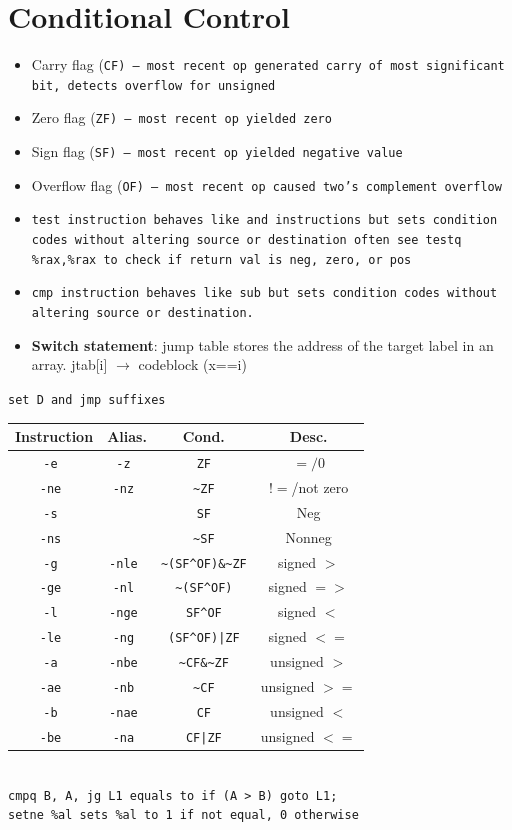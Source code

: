 \section{Conditional Control}
\begin{itemize}[noitemsep, topsep=1pt]
    \item Carry flag (\tt{CF}) -- most recent op generated carry of most significant bit, detects overflow for unsigned
    \item Zero flag (\tt{ZF}) -- most recent op yielded zero
    \item Sign flag (\tt{SF}) -- most recent op yielded negative value
    \item Overflow flag (\tt{OF}) -- most recent op caused two's complement overflow
    \item \tt{test} instruction behaves like \tt{and} instructions but sets condition codes without altering source or destination often see \tt{testq \%rax,\%rax} to check if return val is neg, zero, or pos
    \item \tt{cmp} instruction behaves like \tt{sub} but sets condition codes without altering source or destination.
    \item \textbf{Switch statement}: jump table stores the address of the target label in an array. jtab[i] $\to$ codeblock (x==i)

\end{itemize}
\begin{center}
    \tt{set D} and \tt{jmp} suffixes 
    \begin{tabular}{| c || c | c | c |}
        \hline
        \textbf{Instruction} & \textbf{Alias.} & \textbf{Cond.} & \textbf{Desc.} \\ \hline
        \tt{-e} & \tt{-z} & \verb|ZF| & $=/0$ \\ \hline
        \tt{-ne} & \tt{-nz} & \verb|~ZF| & $!=$/not zero \\ \hline
        \tt{-s} &  & \verb|SF| & Neg \\ \hline
        \tt{-ns} &  & \verb|~SF| & Nonneg \\ \hline
        \tt{-g} & \tt{-nle} & \verb|~(SF^OF)&~ZF| & signed $>$ \\ \hline
        \tt{-ge} & \tt{-nl} & \verb|~(SF^OF)| & signed $=>$ \\ \hline
        \tt{-l} & \tt{-nge} & \verb|SF^OF| & signed $<$ \\ \hline
        \tt{-le} & \tt{-ng} & \verb=(SF^OF)|ZF= & signed $<=$ \\ \hline
        \tt{-a} & \tt{-nbe} & \verb|~CF&~ZF| & unsigned $>$ \\ \hline
        \tt{-ae} & \tt{-nb} & \verb|~CF| & unsigned $>=$ \\ \hline
        \tt{-b} & \tt{-nae} & \verb|CF| & unsigned $<$ \\ \hline
        \tt{-be} & \tt{-na} & \verb=CF|ZF= & unsigned $<=$ \\ \hline
    \end{tabular} \\
    \tt{cmpq B, A},  \tt{jg L1} equals to \tt{if (A > B) goto L1;} \\
    \tt{setne \%al} sets \tt{\%al} to 1 if not equal, 0 otherwise \\
\end{center}
